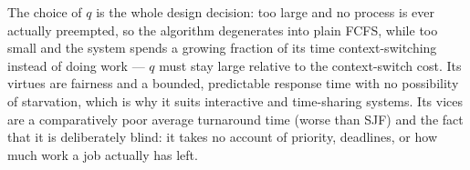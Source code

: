 The choice of $q$ is the whole design decision: too large and no process is ever actually
preempted, so the algorithm degenerates into plain FCFS, while too small and the system
spends a growing fraction of its time context-switching instead of doing work --- $q$ must
stay large relative to the context-switch cost. Its virtues are fairness and a bounded,
predictable response time with no possibility of starvation, which is why it suits
interactive and time-sharing systems. Its vices are a comparatively poor average
turnaround time (worse than SJF) and the fact that it is deliberately blind: it takes no
account of priority, deadlines, or how much work a job actually has left.
